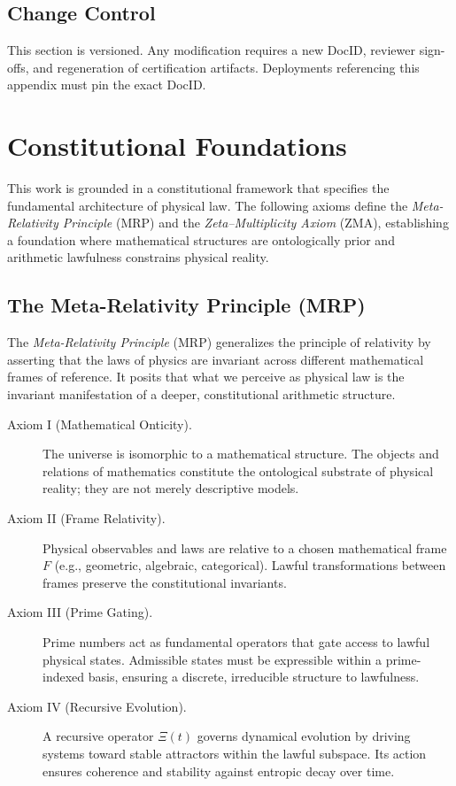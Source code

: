 \documentclass[12]{amsart}
\theoremstyle{plain}
\begin{document}
\subsection*{Change Control}
This section is versioned. Any modification requires a new DocID, reviewer sign-offs, and regeneration of certification artifacts. Deployments referencing this appendix must pin the exact DocID.

\section{Constitutional Foundations}

This work is grounded in a constitutional framework that specifies the fundamental architecture of physical law. The following axioms define the \emph{Meta-Relativity Principle} (MRP) and the \emph{Zeta--Multiplicity Axiom} (ZMA), establishing a foundation where mathematical structures are ontologically prior and arithmetic lawfulness constrains physical reality.

\subsection{The Meta-Relativity Principle (MRP)}

The \emph{Meta-Relativity Principle} (MRP) generalizes the principle of relativity by asserting that the laws of physics are invariant across different mathematical frames of reference. It posits that what we perceive as physical law is the invariant manifestation of a deeper, constitutional arithmetic structure.

\begin{description}
    \item[Axiom I (Mathematical Onticity).] The universe is isomorphic to a mathematical structure. The objects and relations of mathematics constitute the ontological substrate of physical reality; they are not merely descriptive models.

    \item[Axiom II (Frame Relativity).] Physical observables and laws are relative to a chosen mathematical frame $F$ (e.g., geometric, algebraic, categorical). Lawful transformations between frames preserve the constitutional invariants.

    \item[Axiom III (Prime Gating).] Prime numbers act as fundamental operators that gate access to lawful physical states. Admissible states must be expressible within a prime-indexed basis, ensuring a discrete, irreducible structure to lawfulness.

    \item[Axiom IV (Recursive Evolution).] A recursive operator $\Xi(t)$ governs dynamical evolution by driving systems toward stable attractors within the lawful subspace. Its action ensures coherence and stability against entropic decay over time.
\end{description}
\end{document}
